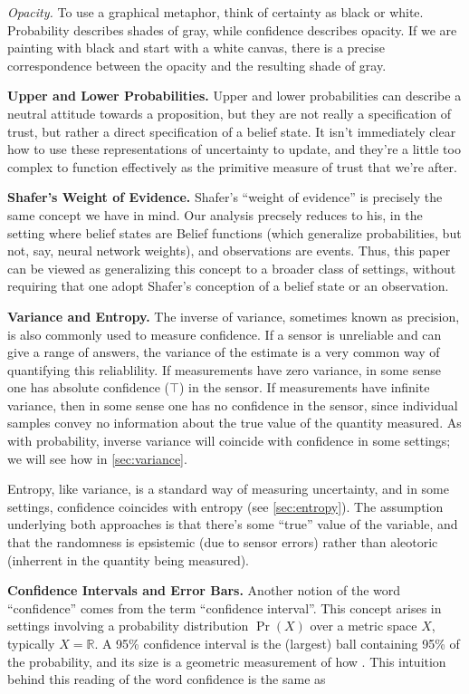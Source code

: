 \textit{Opacity.} To use a graphical metaphor, think of certainty as black or white.
Probability describes shades of gray, while confidence describes opacity.
If we are painting with black and start with a white canvas, there is a precise correspondence between the opacity and the resulting shade of gray.

\textbf{Upper and Lower Probabilities.}
Upper and lower probabilities can describe a neutral attitude towards a proposition, but they are not really a specification of trust, but rather a direct specification of a belief state.
It isn't immediately clear how to use these representations of uncertainty to update, and they're a little too complex to function effectively as the primitive measure of trust that we're after.


\textbf{Shafer's Weight of Evidence.}
Shafer's ``weight of evidence'' is precisely the same concept we have in mind.
Our analysis precsely reduces to his, in the setting where belief states are Belief functions (which generalize probabilities, but not, say, neural network weights), and observations are events.
Thus, this paper can be viewed as generalizing this concept to a broader class of settings, without requiring that one adopt Shafer's conception of a belief state or an observation.


\textbf{Variance and Entropy.}
The inverse of variance, sometimes known as precision,
	is also commonly used to measure confidence.
If a sensor is unreliable and can give a range of answers, the variance of the estimate is a very common way of quantifying this reliablility.
If measurements have zero variance, in some sense one has absolute confidence ($\top$) in the sensor. If measurements have infinite variance, then in some sense one has no confidence in the sensor, since individual samples convey no information about the true value of the quantity measured.
As with probability, inverse variance will coincide with confidence in some settings; we will see how in \cref{sec:variance}.

Entropy, like variance, is a standard way of measuring uncertainty, and in some settings, confidence coincides with entropy (see \cref{sec:entropy}).
The assumption underlying both approaches is that there's some ``true'' value of the variable, and that the randomness is epsistemic (due to sensor errors) rather than aleotoric (inherrent in the quantity being measured).

\textbf{Confidence Intervals and Error Bars.}
Another notion of the word ``confidence'' comes from the term ``confidence interval''.
This concept arises in settings involving a probability distribution $\Pr(X)$ over a metric space $X$, typically $X = \mathbb R$.
A 95\% confidence interval is the (largest) ball containing 95\% of the probability, and its size is a geometric measurement of how .
This intuition behind this reading of the word confidence is the same as
